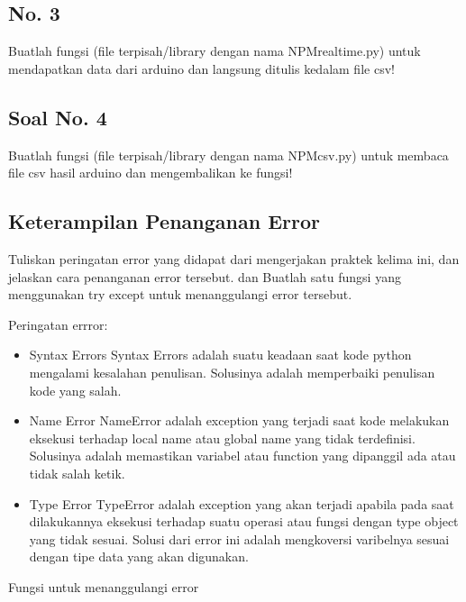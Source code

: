 

\subsection{No. 3}
Buatlah  fungsi  (file  terpisah/library  dengan  nama  NPMrealtime.py) untuk mendapatkan data dari arduino dan langsung ditulis kedalam file csv!



\subsection{Soal No. 4}
Buatlah fungsi (file terpisah/library dengan nama NPMcsv.py) untuk membaca file csv hasil arduino dan mengembalikan ke fungsi!



\subsection{Keterampilan Penanganan Error}
Tuliskan  peringatan  error  yang  didapat  dari  mengerjakan  praktek  kelima  ini, dan  jelaskan  cara  penanganan  error  tersebut.   dan  Buatlah  satu  fungsi  yang menggunakan try except untuk menanggulangi error tersebut.

\hfill \break
Peringatan errror:
\begin{itemize}
	\item Syntax Errors
	Syntax Errors adalah suatu keadaan saat kode python mengalami kesalahan penulisan. Solusinya adalah memperbaiki penulisan kode yang salah.
	
	\item Name Error
	NameError adalah exception yang terjadi saat kode melakukan eksekusi terhadap local name atau global name yang tidak terdefinisi. Solusinya adalah memastikan variabel atau function yang dipanggil ada atau tidak salah ketik.
	
	\item Type Error
	TypeError adalah exception yang akan terjadi apabila pada saat dilakukannya eksekusi terhadap suatu operasi atau fungsi dengan type object yang tidak sesuai. Solusi dari error ini adalah mengkoversi varibelnya sesuai dengan tipe data yang akan digunakan.
\end{itemize}

\hfill \break
Fungsi untuk menanggulangi error


